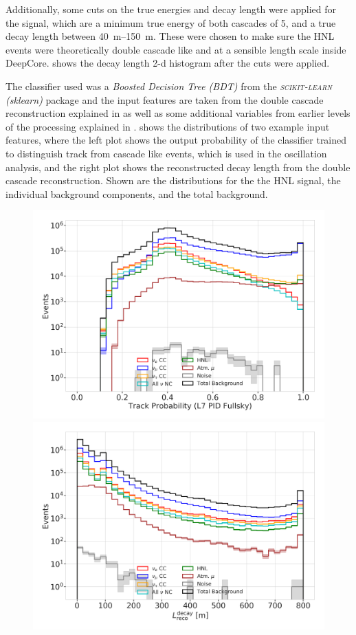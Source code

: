 Additionally, some cuts on the true energies and decay length were applied for the signal, which are a minimum true energy of both cascades of \SI{5}{\gev}, and a true decay length between \SIrange[range-phrase={~and~}]{40}{150}{\meter}. These were chosen to make sure the HNL events were theoretically double cascade like and at a sensible length scale inside DeepCore.  shows the decay length 2-d histogram after the cuts were applied.

The classifier used was a \textit{Boosted Decision Tree (BDT)} from the \textit{\textsc{scikit-learn} (sklearn)} package  and the input features are taken from the double cascade reconstruction explained in  as well as some additional variables from earlier levels of the processing explained in .  shows the distributions of two example input features, where the left plot shows the output probability of the classifier trained to distinguish track from cascade like events, which is used in the oscillation analysis, and the right plot shows the reconstructed decay length from the double cascade reconstruction. Shown are the distributions for the the HNL signal, the individual background components, and the total background. 

\begin{figure}[h]
	\centering
    \includegraphics[width=0.49\linewidth]{figures/results/190607/classification/1_d_distr_L7_PIDClassifier_FullSky_ProbTrack_with_ratio_unweighted.png}
    \includegraphics[width=0.49\linewidth]{figures/results/190607/classification/1_d_distr_reco_decayL_with_ratio_unweighted.png}
    \caption[]{}
\end{figure}


